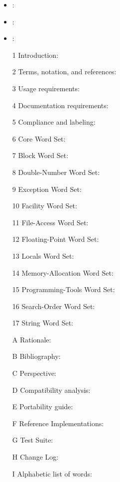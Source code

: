 	\begin{itemize}
	\item {}:
	\item {}:
	\item {}:
	\item[1] Introduction:
	\item[2] Terms, notation, and references:
	\item[3] Usage requirements:
	\item[4] Documentation requirements:
	\item[5] Compliance and labeling:
	\item[6] Core Word Set:
	\item[7] Block Word Set:
	\item[8] Double-Number Word Set:
	\item[9] Exception Word Set:
	\item[10] Facility Word Set:
	\item[11] File-Access Word Set:
	\item[12] Floating-Point Word Set:
	\item[13] Locals Word Set:
	\item[14] Memory-Allocation Word Set:
	\item[15] Programming-Tools Word Set:
	\item[16] Search-Order Word Set:
	\item[17] String Word Set:
	\item[A] Rationale: %
	\item[B] Bibliography: %
	\item[C] Perspective: %
	\item[D] Compatibility analysis: %
	\item[E] Portability guide: %
	\item[F] Reference Implementations: %
	\item[G] Test Suite: %
	\item[H] Change Log: %
	\item[I] Alphabetic list of words: %
	\end{itemize}

\endinput

\version{ToDo}{}{\empty}
	\begin{itemize}
	\item Legacy words
	\item Develop new Globalisation word set
	\item Develop extended Memory Access word set
	\end{itemize}

